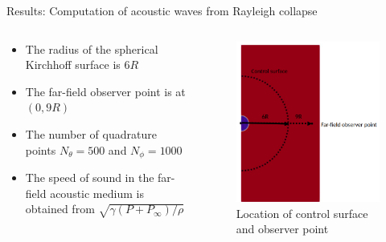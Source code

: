 \documentclass[10pt, aspectratio=169]{beamer}
\begin{document}
\begin{frame}{Results: Computation of acoustic waves from Rayleigh collapse}
							
	\begin{columns}
		\begin{column}{0.5\textwidth}
			\begin{itemize}
				\item The radius of the spherical Kirchhoff surface is $6R$
				\item The far-field observer point is at $(0, 9R)$ 
				\item The number of quadrature points $N_{\theta} = 500$ and $N_{\phi} = 1000$
				\item The speed of sound in the far-field acoustic medium is obtained from $\sqrt{\gamma(P + P_{\infty})/\rho}$	
			\end{itemize}
		\end{column}
																																			
		\begin{column}{0.32\textwidth}
			\begin{figure}
				\centering
				\includegraphics[scale=0.26]{images/schematic3.png}
				\caption*{Location of control surface and observer point}
			\end{figure}
		\end{column}
														
	\end{columns}
\end{frame}
\end{document}

